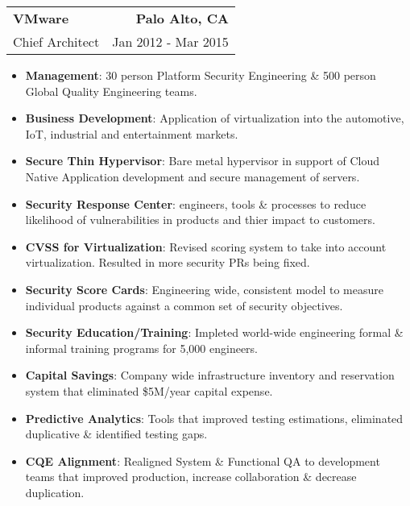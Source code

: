 \documentclass[letterpaper,11pt]{article}
\makeatletter
\newcommand{\resumeSubheading}[4]{
  \vspace{-1pt}
    \item
    \begin{tabular*}{1.0\textwidth}[t]{l@{\extracolsep{\fill}}r}
      \textbf{\Large#1} & \textbf{#2} \\
      {\large #3} & {\large #4}
    \end{tabular*}\vspace{-5pt}
  }
\newcommand{\resumeItem}[2]{\item{{\textbf{\small#1}}: {\small#2 \vspace{-1pt}}}}
\newcommand{\resumeItemListStart}{\begin{itemize}}
\newcommand{\resumeItemListEnd}{\end{itemize}}\vspace{-10pt}
\makeatother
\begin{document}
        \resumeSubheading
            {VMware}
            {Palo Alto, CA}
            {Chief Architect}
            {Jan 2012 - Mar 2015}
            \resumeItemListStart
                \resumeItem{Management}{30 person Platform Security Engineering \& 500 person Global Quality Engineering teams.}
                \resumeItem{Business Development}{Application of virtualization into the automotive, IoT, industrial and entertainment markets.}
                \resumeItem{Secure Thin Hypervisor}{Bare metal hypervisor in support of Cloud Native Application development and secure management of servers.}
                \resumeItem{Security Response Center}{engineers, tools \& processes to reduce likelihood of vulnerabilities in products and thier impact to customers.}
                \resumeItem{CVSS for Virtualization}{Revised scoring system to take into account virtualization.  Resulted in more security PRs being fixed.}
                \resumeItem{Security Score Cards}{Engineering wide, consistent model to measure individual products against a common set of security objectives.}
                \resumeItem{Security Education/Training}{Impleted world-wide engineering formal \& informal training programs for 5,000 engineers.}
                \resumeItem{Capital Savings}{Company wide infrastructure inventory and reservation system that eliminated \$5M/year capital expense.}
                \resumeItem{Predictive Analytics}{Tools that improved testing estimations, eliminated duplicative \& identified testing gaps.}
                \resumeItem{CQE Alignment}{Realigned System \& Functional QA to development teams that improved production, increase collaboration \& decrease duplication.}
            \resumeItemListEnd
  
\end{document}
